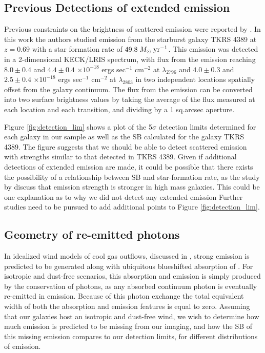 \documentclass[twocolumn]{aastex61}
\def \msunperyr {{\; M_{\odot}\rm \;yr^{-1}}}
\begin{document}
\subsection{Previous Detections of extended  emission}
Previous constraints on the brightness of scattered  emission were reported by \cite{Rubin_2011}. In this work the authors studied emission from the starburst galaxy TKRS 4389 at $z = 0.69$ with a star formation rate of $49.8\msunperyr$. This emission was detected in a 2-dimensional KECK/LRIS spectrum, with flux from the emission reaching $8.0 \pm 0.4$ and $4.4 \pm 0.4$ $\times10^{-18}$ ergs sec$^{-1}$ cm$^{-2}$ at  $\lambda _{2796}$ and $4.0 \pm 0.3$ and $2.5 \pm 0.4$ $\times10^{-18}$ ergs sec$^{-1}$ cm$^{-2}$ at $\lambda_{2803}$ in two independent locations spatially offset from the galaxy continuum. The flux from the emission can be converted into two surface brightness values by taking the average of the flux measured at each location and each transition, and dividing by a 1 sq.arcsec aperture. 

Figure \ref{fig:detection_lim} shows a plot of the 5$\sigma$ detection limits determined for each galaxy in our sample as well as the SB calculated for the galaxy TKRS 4389. The figure suggests that we should be able to detect scattered  emission with strengths similar to that detected in TKRS 4389. Given if  additional detections of extended  emission are made, it could be possible that there exists the possibility of a relationship between SB and star-formation rate, as the study by \cite{Erb2012} discuss that emission strength is stronger in high mass galaxies. This could be one explanation as to why we did not detect any extended  emission Further studies need to be pursued to add additional points to Figure \ref{fig:detection_lim}.

\subsection{Geometry of re-emitted photons}
In idealized wind models of cool gas outflows, discussed in \cite{Prochaska_2011}, strong  emission is predicted to be generated along with ubiquitous blueshifted absorption of . For isotropic and dust-free scenarios, this absorption and emission is simply produced by the conservation of photons, as any absorbed continuum photon is eventually re-emitted in emission. Because of this photon exchange the total equivalent width of both the absorption and emission features is equal to zero.
Assuming that our galaxies host an isotropic and dust-free wind, we wish to determine how much emission is predicted to be missing from our imaging, and how the SB of this missing emission compares to our detection limits, for different distributions of emission. 
\end{document}
